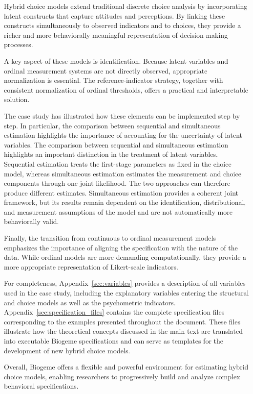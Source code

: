 \documentclass[12pt,a4paper]{article}
\begin{document}
Hybrid choice models extend traditional discrete choice analysis by
incorporating latent constructs that capture attitudes and
perceptions. By linking these constructs simultaneously to observed
indicators and to choices, they provide a richer and more behaviorally
meaningful representation of decision-making processes.

A key aspect of these models is identification. Because latent
variables and ordinal measurement systems are not directly observed,
appropriate normalization is essential. The reference-indicator
strategy, together with consistent normalization of ordinal
thresholds, offers a practical and interpretable solution.

The case study has illustrated how these elements can be implemented
step by step. In particular, the comparison between sequential and
simultaneous estimation highlights the importance of accounting for
the uncertainty of latent variables. The comparison between sequential and simultaneous estimation
highlights an important distinction in the treatment of latent
variables. Sequential estimation treats the first-stage parameters as
fixed in the choice model, whereas simultaneous estimation estimates
the measurement and choice components through one joint likelihood.
The two approaches can therefore produce different estimates.
Simultaneous estimation provides a coherent joint framework, but its
results remain dependent on the identification, distributional, and
measurement assumptions of the model and are not automatically more
behaviorally valid.

Finally, the transition from continuous to ordinal measurement models
emphasizes the importance of aligning the specification with the
nature of the data. While ordinal models are more demanding
computationally, they provide a more appropriate representation of
Likert-scale indicators.

For completeness, Appendix~\ref{sec:variables} provides a description
of all variables used in the case study, including the explanatory
variables entering the structural and choice models as well as the
psychometric indicators. Appendix~\ref{sec:specification_files}
contains the complete specification files corresponding to the
examples presented throughout the document. These files illustrate how
the theoretical concepts discussed in the main text are translated
into executable Biogeme specifications and can serve as templates for
the development of new hybrid choice models.

Overall, Biogeme offers a flexible and powerful environment for
estimating hybrid choice models, enabling researchers to progressively
build and analyze complex behavioral specifications.
\end{document}
